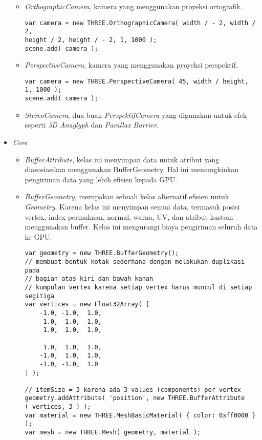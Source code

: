 \begin{itemize}
\begin{itemize}
	\item{\it OrthographicCamera}, kamera yang menggunakan proyeksi ortografik.
\begin{lstlisting}
var camera = new THREE.OrthographicCamera( width / - 2, width / 2, 
height / 2, height / - 2, 1, 1000 );
scene.add( camera );
\end{lstlisting}
	
	\item {\it PerspectiveCamera}, kamera yang menggunakan pyoyeksi perspektif.
\begin{lstlisting}
var camera = new THREE.PerspectiveCamera( 45, width / height, 
1, 1000 );
scene.add( camera );
\end{lstlisting}
	
	\item {\it StereoCamera}, dua buah {\it PerspektifCamera} yang digunakan untuk efek seperti {\it 3D Anaglyph} dan {\it Parallax Barrier}.

	\end{itemize}
	
\item \textit{Core}
	\begin{itemize}
	\item{\it BufferAttribute}, kelas ini menyimpan data untuk atribut yang diasosiasikan menggunakan BufferGeometry. Hal ini memungkinkan pengiriman data yang lebih efisien kepada GPU.
	\item{\it BufferGeometry}, merupakan sebuah kelas alternatif efisien untuk {\it Geometry}. Karena kelas ini menyimpan semua data, termasuk posisi vertex, index permukaan, normal, warna, UV, dan atribut kustom menggunakan buffer. Kelas ini mengurangi biaya pengiriman seluruh data ke GPU.
\begin{lstlisting}
var geometry = new THREE.BufferGeometry();
// membuat bentuk kotak sederhana dengan melakukan duplikasi pada
// bagian atas kiri dan bawah kanan
// kumpulan vertex karena setiap vertex harus muncul di setiap segitiga
var vertices = new Float32Array( [
	-1.0, -1.0,  1.0,
	 1.0, -1.0,  1.0,
	 1.0,  1.0,  1.0,

	 1.0,  1.0,  1.0,
	-1.0,  1.0,  1.0,
	-1.0, -1.0,  1.0
] );

// itemSize = 3 karena ada 3 values (components) per vertex
geometry.addAttribute( 'position', new THREE.BufferAttribute
( vertices, 3 ) );
var material = new THREE.MeshBasicMaterial( { color: 0xff0000 } );
var mesh = new THREE.Mesh( geometry, material );
\end{lstlisting}


\end{itemize}
\end{itemize}
